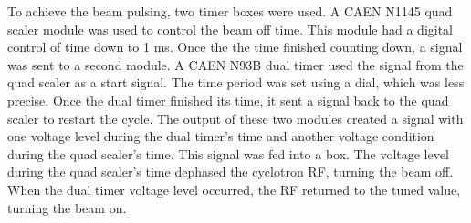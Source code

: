\documentclass[main.tex]{subfiles}
\begin{document}
To achieve the beam pulsing, two timer boxes were used.
A CAEN N1145 quad scaler module was used to control the beam off time.
This module had a digital control of time down to 1 ms.
Once the the time finished counting down, a signal was sent to a second module. 
A CAEN N93B dual timer used the signal from the quad scaler as a start signal.
The time period was set using a dial, which was less precise. 
Once the dual timer finished its time, it sent a signal back to the quad scaler to restart the cycle.
The output of these two modules created a signal with one voltage level during the dual timer's time and another voltage condition during the quad scaler's time.
This signal was fed into a box.
The voltage level during the quad scaler's time dephased the cyclotron RF, turning the beam off.
When the dual timer voltage level occurred, the RF returned to the tuned value, turning the beam on.  
\end{document}
